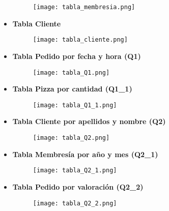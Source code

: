 \documentclass[a4paper]{article}
\begin{document}
\begin{itemize}
    \begin{figure}[H]
        \centering
        \texttt{[image: tabla\_membresia.png]}
        \label{fig:tabla_membresia}
    \end{figure}

    \item \textbf{\large{Tabla Cliente}}

    \begin{figure}[H]
        \centering
        \texttt{[image: tabla\_cliente.png]}
        \label{fig:tabla_cliente}
    \end{figure}

    \item \textbf{\large{Tabla Pedido por fecha y hora (Q1)}}

    \begin{figure}[H]
        \centering
        \texttt{[image: tabla\_Q1.png]}
        \label{fig:tabla_Q1}
    \end{figure}

    \item \textbf{\large{Tabla Pizza por cantidad (Q1\_1)}}

    \begin{figure}[H]
        \centering
        \texttt{[image: tabla\_Q1\_1.png]}
        \label{fig:tabla_Q1_1}
    \end{figure}

\newpage

    \item \textbf{\large{Tabla Cliente por apellidos y nombre (Q2)}}

    \begin{figure}[H]
        \centering
        \texttt{[image: tabla\_Q2.png]}
        \label{fig:tabla_Q2}
    \end{figure}

    \item \textbf{\large{Tabla Membresía por año y mes (Q2\_1)}}

    \begin{figure}[H]
        \centering
        \texttt{[image: tabla\_Q2\_1.png]}
        \label{fig:tabla_Q2_1}
    \end{figure}

    \item \textbf{\large{Tabla Pedido por valoración (Q2\_2)}}

    \begin{figure}[H]
        \centering
        \texttt{[image: tabla\_Q2\_2.png]}
        \label{fig:tabla_Q2_2}
    \end{figure}


\end{itemize}
\end{document}
